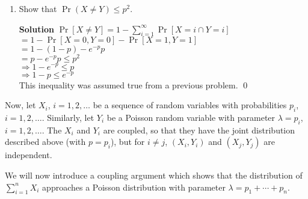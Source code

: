\documentclass[11pt]{article}
\newenvironment{Parts}{\begin{enumerate}[label=(\alph*)]}{\end{enumerate}}
\newcommand*{\Part}{\item}
\begin{document}
\begin{Parts}
    \Part Show that $\Pr(X \neq Y) \leq p^2$.
\begin{mdframed} \textbf{Solution} 
$\Pr[X \neq Y]=1-\sum_{i=1}^{\infty}\Pr[X=i \cap Y=i]$ \\
$=1-\Pr[X=0,Y=0]-\Pr[X=1,Y=1]$ \\
$=1-(1-p)-e^{-p}p$ \\
$=p-e^{-p}p\leq p^2$ \\
$\Rightarrow 1-e^{-p} \leq p$ \\
$\Rightarrow 1-p \leq e^{-p}$ \\
This inequality was assumed true from a previous problem. \qed
\end{mdframed}
\end{Parts}

Now, let $X_i$, $i = 1, 2, \dotsc$ be a sequence of random variables with probabilities $p_i$, $i = 1, 2, \dotsc$. Similarly, let $Y_i$ be a Poisson random variable with parameter $\lambda = p_i$, $i=1, 2, \dotsc$. The $X_i$ and $Y_i$ are coupled, so that they have the joint distribution described above (with $p = p_i$), but for $i \neq j$, $(X_i, Y_i)$ and $(X_j, Y_j)$ are independent.

We will now introduce a coupling argument which shows that the distribution of $\sum_{i=1}^n X_i$ approaches a Poisson distribution with parameter $\lambda = p_1 + \cdots + p_n$.
\end{document}
